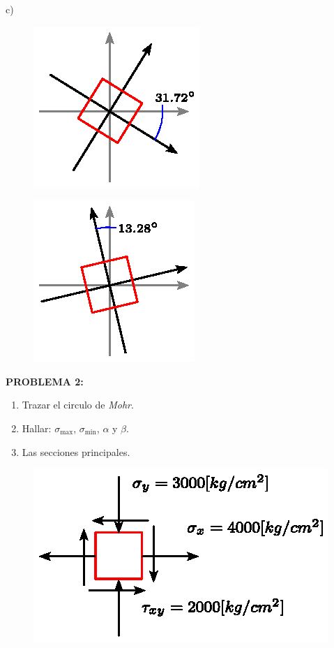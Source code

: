 \documentclass[letter,10pt,twoside]{article}
\begin{document}
c) 

\begin{figure}[H]
\centering
\includegraphics[scale=1.6]{resources/f12.eps}
\end{figure}

\begin{figure}[H]
\centering
\includegraphics[scale=1.6]{resources/f13.eps}
\end{figure}

\newpage

\colorbox{blue!25}{\textbf{PROBLEMA 2:}}

\begin{enumerate}[label=\alph*)]
    \item Trazar el circulo de \emph{Mohr}.
    \item Hallar: $\sigma_{\text{max}}$, $\sigma_{\text{min}}$, $\alpha$ y
        $\beta$.
    \item Las secciones principales.
\end{enumerate}

\begin{figure}[H]
\centering
\includegraphics[scale=1.2]{resources/f20.eps}
\end{figure}
\end{document}
